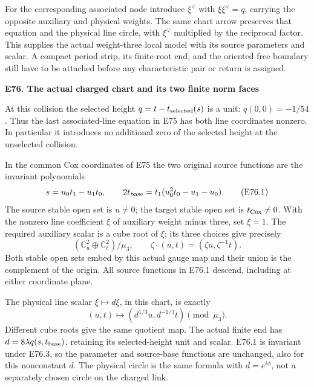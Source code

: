 For the corresponding associated node introduce \(\xi^\vee\)
with \(\xi\xi^\vee=q\), carrying the opposite auxiliary and
physical weights. The same chart arrow preserves that
equation and the physical line circle, with \(\xi^\vee\)
multiplied by the reciprocal factor. This supplies the
actual weight-three local model with its source parameters
and scalar. A compact period strip, its finite-root end,
and the oriented free boundary still have to be attached
before any characteristic pair or return is assigned.

\par

\medskip\noindent\textbf{E76. The actual charged chart and its two finite norm faces}

\par\nobreak

At this collision the selected height
\(q=t-t_{\rm selected}(s)\) is a unit: \(q(0,0)=-1/54\).
Thus the last associated-line equation in E75 has both line
coordinates nonzero. In particular it introduces no additional
zero of the selected height at the unselected collision.

In the common Cox coordinates of E75 the two original source
functions are the invariant polynomials
\[
 s=u_0t_1-u_1t_0,\qquad
 2t_{\rm base}=t_1(u_0^2t_0-u_1-u_0).           \tag{E76.1}
\]
The source stable open set is \(u\ne0\); the target stable
open set is \(t_{\rm Cox}\ne0\). With the nonzero line
coefficient \(\xi\) of auxiliary weight minus three, set
\(\xi=1\). The required auxiliary scalar is a cube root of
\(\xi\); its three choices give precisely
\[
 (\mathbb C^2_u\oplus\mathbb C^2_t)/\mu_3,\qquad
 \zeta\cdot(u,t)=(\zeta u,\zeta^{-1}t).
 \tag{E76.2}
\]
Both stable open sets embed by this actual gauge map and their
union is the complement of the origin. All source functions
in E76.1 descend, including at either coordinate plane.

The physical line scalar \(\xi\mapsto d\xi\), in this chart,
is exactly
\[
 (u,t)\longmapsto(d^{1/3}u,d^{-1/3}t)
                     \pmod{\mu_3}.             \tag{E76.3}
\]
Different cube roots give the same quotient map. The actual
finite end has \(d=8\lambda q(s,t_{\rm base})\), retaining
its selected-height unit and scalar. E76.1 is invariant under
E76.3, so the parameter and source-base functions are unchanged,
also for this nonconstant \(d\). The physical circle is the
same formula with \(d=e^{i\phi}\), not a separately chosen
circle on the charged link.

